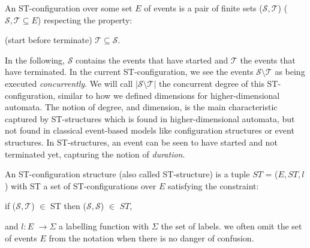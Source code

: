     \begin{definition}
        \label{def:st-configuration}
        An ST-configuration over some set $E$ of events is a pair of finite sets ($\mathcal{S},\mathcal{T}$) ($\mathcal{S}, \mathcal{T} \subseteq E$) respecting the property:
        
        \begin{center}
            (start before terminate) $\mathcal{T} \subseteq \mathcal{S}$.
        \end{center}
    \end{definition}
    
    In the following, $\mathcal{S}$ contains the events that have started and $\mathcal{T}$ the events that have terminated. In the current ST-configuration, we see the events $\mathcal{S} \setminus \mathcal{T}$ as being executed \emph{concurrently}. We will call $| \mathcal{S} \setminus \mathcal{T} |$ the concurrent degree of this ST-configuration, similar to how we defined dimensions for higher-dimensional automata. The notion of degree, and dimension, is the main characteristic captured by ST-structures which is found in higher-dimensional automata, but not found in classical event-based models like configuration structures or event structures. In ST-structures, an event can be seen to have started and not terminated yet, capturing the notion of \emph{duration}.
    
    
    
    \begin{definition}
        \label{def:st-structures}
        An ST-configuration structure (also called ST-structure) is a tuple $ST$ = ($E, ST, l$) with ST a set of ST-configurations over $E$ satisfying the constraint:
        
        \begin{center}
            if ($\mathcal{S},\mathcal{T}$) $\in$ ST then ($\mathcal{S},\mathcal{S}$) $\in$ $ST$,
        \end{center}
    
    and $l:E$ $\rightarrow \Sigma$ a labelling function with $\Sigma$ the set of labels. we often omit the set of events $E$ from the notation when there is no danger of confusion.
    \end{definition}
    
